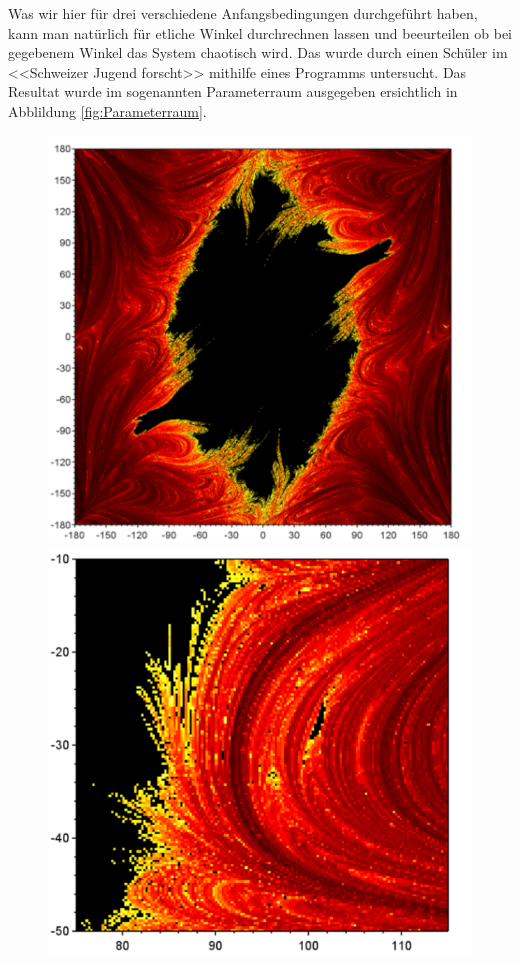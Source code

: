 Was wir hier für drei verschiedene Anfangsbedingungen durchgeführt haben, kann man natürlich
für etliche Winkel durchrechnen lassen und beeurteilen ob bei gegebenem Winkel das System chaotisch wird.
Das wurde durch einen Schüler im <<Schweizer Jugend forscht>> mithilfe eines Programms untersucht.
Das Resultat wurde im sogenannten Parameterraum ausgegeben
ersichtlich in Abblildung \ref{fig:Parameterraum}.
\begin{figure}
    \centering
    \begin{minipage}{0.45\textwidth}
        \centering
        \includegraphics[width=\textwidth]{papers/doppelpendel/images/parameterraum.png}
    \end{minipage}
    \hfill
    \begin{minipage}{0.45\textwidth}
        \centering
        \includegraphics[width=\textwidth]{papers/doppelpendel/images/parameterraum_stabile_inseln.png}

\end{minipage}
\end{figure}
